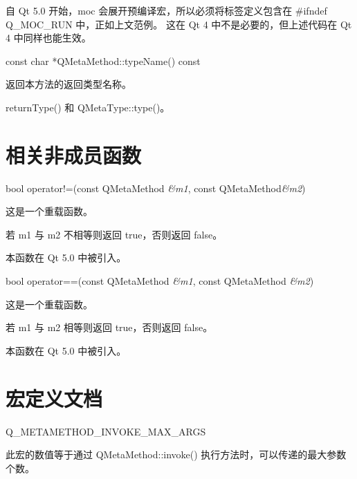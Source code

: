 \begin{notice}
自 Qt 5.0 开始，moc 会展开预编译宏，所以必须将标签定义包含在 \#ifndef Q\_MOC\_RUN 中，正如上文范例。
这在 Qt 4 中不是必要的，但上述代码在 Qt 4 中同样也能生效。
\end{notice}

const char *QMetaMethod::typeName() const

返回本方法的返回类型名称。

\begin{seeAlso}
returnType() 和 QMetaType::type()。
\end{seeAlso}

\section{相关非成员函数}

bool operator!=(const QMetaMethod \emph{\&m1}, const QMetaMethod\emph{\&m2})

这是一个重载函数。

若 m1 与 m2 不相等则返回 true，否则返回 false。

本函数在 Qt 5.0 中被引入。

bool operator==(const QMetaMethod \emph{\&m1}, const QMetaMethod \emph{\&m2})

这是一个重载函数。

若 m1 与 m2 相等则返回 true，否则返回 false。

本函数在 Qt 5.0 中被引入。

\section{宏定义文档}

Q\_METAMETHOD\_INVOKE\_MAX\_ARGS

此宏的数值等于通过 QMetaMethod::invoke() 执行方法时，可以传递的最大参数个数。